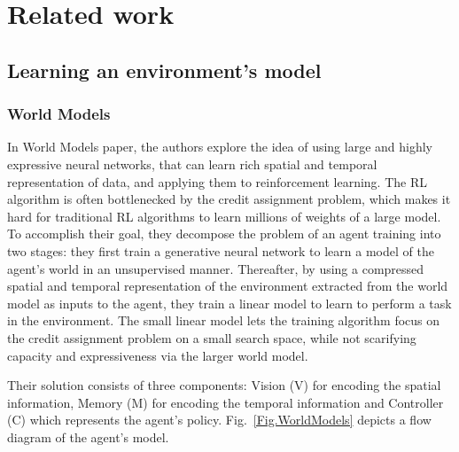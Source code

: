 \section{Related work}

\subsection{Learning an environment's model}

\subsubsection{World Models}

In World Models\cite{Algo.WorldModels} paper, the authors explore the idea of using large and highly expressive neural networks, that can learn rich spatial and temporal representation of data, and applying them to reinforcement learning. The RL algorithm is often bottlenecked by the credit assignment problem, which makes it hard for traditional RL algorithms to learn millions of weights of a large model. To accomplish their goal, they decompose the problem of an agent training into two stages: they first train a generative neural network to learn a model of the agent's world in an unsupervised manner. Thereafter, by using a compressed spatial and temporal representation of the environment extracted from the world model as inputs to the agent, they train a linear model to learn to perform a task in the environment. The small linear model lets the training algorithm focus on the credit assignment problem on a small search space, while not scarifying capacity and expressiveness via the larger world model.

Their solution consists of three components: Vision (V) for encoding the spatial information, Memory (M) for encoding the temporal information and Controller (C) which represents the agent's policy. Fig.~\ref{Fig.WorldModels} depicts a flow diagram of the agent's model.

